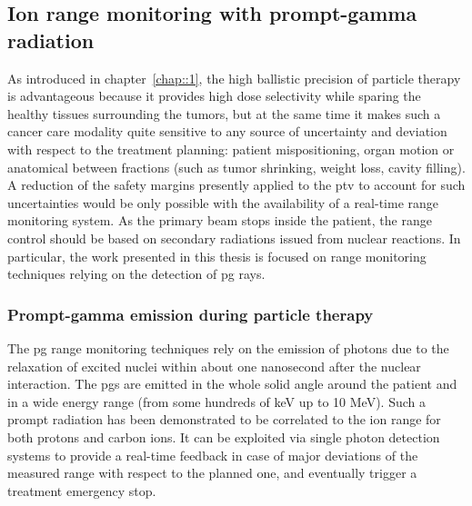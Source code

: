 \subsection{Ion range monitoring with prompt-gamma radiation}\label{chap2::sec::PGionRangeMonitoring}

As introduced in chapter~\ref{chap::1}, the high ballistic precision of particle therapy is advantageous because it provides high dose selectivity while sparing the healthy tissues surrounding the tumors, but at the same time it makes such a cancer care modality quite sensitive to any source of uncertainty and deviation with respect to the treatment planning: patient mispositioning, organ motion or anatomical between fractions (such as tumor shrinking, weight loss, cavity filling). A reduction of the safety margins presently applied to the \gls{ptv} to account for such uncertainties would be only possible with the availability of a real-time range monitoring system. As the primary beam stops inside the patient, the range control should be based on secondary radiations issued from nuclear reactions. In particular, the work presented in this thesis is focused on range monitoring techniques relying on the detection of \gls{pg} rays.
 
\subsubsection{Prompt-gamma emission during particle therapy}\label{chap2::subsec::PGproduction}

The \gls{pg} range monitoring techniques rely on the emission of photons due to the relaxation of excited nuclei within about one nanosecond after the nuclear interaction. The \glspl{pg} are emitted in the whole solid angle around the patient and in a wide energy range (from some hundreds of keV up to 10 MeV). Such a prompt radiation has been demonstrated to be correlated to the ion range for both protons and carbon ions. It can be exploited via single photon detection systems to provide a real-time feedback in case of major deviations of the measured range with respect to the planned one, and eventually trigger a treatment emergency stop.


